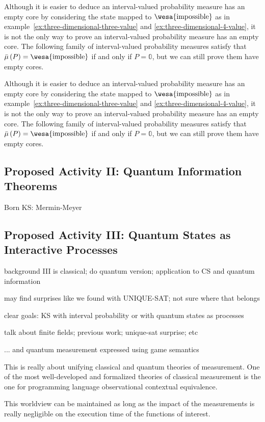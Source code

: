 \documentclass{article}
\theoremstyle{remark}
\newcommand{\imposs}{{\mbox{\wesa{impossible}}}}
\begin{document}
Although it is easier to deduce an interval-valued probability measure
has an empty core by considering the state mapped to $\imposs$ as
in example~\ref{ex:three-dimensional-three-value} and \ref{ex:three-dimensional-4-value},
it is not the only way to prove an interval-valued probability measure
has an empty core. The following family of interval-valued probability
measures satisfy that $\bar{\mu}\left(P\right)=\imposs$ if and only
if $P=\mathbb{0}$, but we can still prove them have empty cores.

Although it is easier to deduce an interval-valued probability measure
has an empty core by considering the state mapped to $\imposs$ as
in example~\ref{ex:three-dimensional-three-value} and \ref{ex:three-dimensional-4-value},
it is not the only way to prove an interval-valued probability measure
has an empty core. The following family of interval-valued probability
measures satisfy that $\bar{\mu}\left(P\right)=\imposs$ if and only
if $P=\mathbb{0}$, but we can still prove them have empty cores.

\subsection{Proposed Activity II: Quantum Information Theorems} 

Born
KS: Mermin-Meyer

\subsection{Proposed Activity III: Quantum States as Interactive Processes}

background III is classical; do quantum version; application to CS and
quantum information

may find surprises like we found with UNIQUE-SAT; not sure where that belongs

clear goals: KS with interval probability or with quantum states as
processes

talk about finite fields; previous work; unique-sat surprise; etc

... and quantum measurement expressed using game semantics
 
This is really about unifying classical and quantum theories of
measurement. One of the most well-developed and formalized theories of
classical measurement is the one for programming language
observational contextual equivalence.


This worldview can be maintained as long as the impact of the
measurements is really negligible on the execution time of the
functions of interest.
\end{document}
